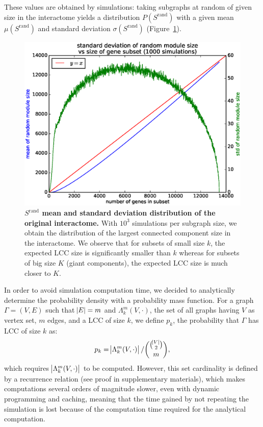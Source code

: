 \documentclass[letterpaper]{article}
\begin{document}
These values are obtained by simulations: taking subgraphs at random of given size in the interactome yields a
distribution $P(S^{\text{rand}})$ with a given mean $\mu(S^{\text{rand}})$ and standard deviation
$\sigma(S^{\text{rand}})$ (Figure~\ref{fig:Srand distribution}).

\begin{figure}[!h]\centering
	\includegraphics[width=.45\textwidth]{images/Srand_distribution_1000_sims.eps}
	\vspace{-.5cm}
	\caption{{\bf $S^{\text{rand}}$ mean and standard deviation distribution of the original interactome.}
	With $10^3$ simulations per subgraph size, we obtain the distribution of the largest connected component size
	in the interactome. We observe that for subsets of small size $k$, the expected LCC size is significantly smaller than $k$
	whereas for subsets of big size $K$ (giant components), the expected LCC size is much closer to $K$.
	\label{fig:Srand distribution}}
	\vspace{-.5cm}
\end{figure}

In order to avoid simulation computation time, we decided to analytically determine the probability density
with a probability mass function. For a graph $\Gamma = (V, E)$ such that $\abs E = m$ and
$\Lambda_k^m(V, \cdot)$, the set of all graphs having $V$ as vertex set, $m$ edges, and a LCC of size $k$,
we define $p_k$, the probability that $\Gamma$ has LCC of size $k$ as:
\begin{equation}
	p_k = \abs {\Lambda_k^m(V, \cdot)}/\binom {\binom {\abs V}2}m,
\end{equation}
which requires $\abs {\Lambda_k^m(V, \cdot)}$ to be computed. However, this set cardinality is defined by a
recurrence relation (see proof in supplementary materials), which makes computations several orders of
magnitude slower, even with dynamic programming and caching, meaning that the time gained by not repeating
the simulation is lost because of the computation time required for the analytical computation.
\end{document}
